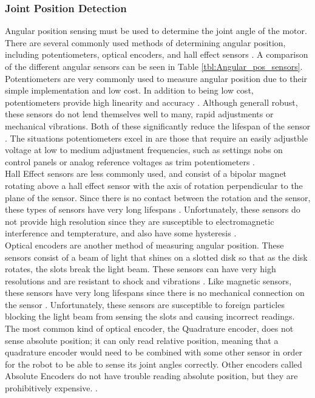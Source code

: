 \subsubsection{Joint Position Detection}
Angular position sensing must be used to determine the joint angle of the motor. There are several commonly used methods of determining angular position, including potentiometers, optical encoders, and hall effect sensors \cite{Pot_vs_Sensor,Choose_Sensor_Technology,Choose_Position_Sensor}. A comparison of the different angular sensors can be seen in Table \ref{tbl:Angular_pos_sensors}. \\
\newline
Potentiometers are very commonly used to measure angular position due to their simple implementation and low cost. In addition to being low cost, potentiometers provide high linearity and accuracy \cite{Choose_Position_Sensor}. Although generall robust, these sensors do not lend themselves well to many, rapid adjustments or mechanical vibrations. Both of these significantly reduce the lifespan of the sensor \cite{Pot_vs_Sensor,Choose_Position_Sensor}. The situations potentiometers excel in are those that require an easily adjustble voltage at low to medium adjustment frequencies, such as settings nobs on control panels or analog reference voltages as trim potentiometers \cite{Pot_vs_Sensor}. \\
\newline
Hall Effect sensors are less commonly used, and consist of a bipolar magnet rotating above a hall effect sensor with the axis of rotation perpendicular to the plane of the sensor. Since there is no contact between the rotation and the sensor, these types of sensors have very long lifespans \cite{Pot_vs_Sensor}. Unfortunately, these sensors do not provide high resolution since they are susceptible to electromagnetic interference and tempterature, and also have some hysteresis \cite{Choose_Position_Sensor}. \\
\newline
Optical encoders are another method of measuring angular position. These sensors consist of a beam of light that shines on a slotted disk so that as the disk rotates, the slots break the light beam. These sensors can have very high resolutions and are resistant to shock and vibrations \cite{Choose_Sensor_Technology}. Like magnetic sensors, these sensors have very long lifespans since there is no mechanical connection on the sensor \cite{Pot_vs_Sensor}. Unfortunately, these sensors are susceptible to foreign particles blocking the light beam from sensing the slots and causing incorrect readings. The most common kind of optical encoder, the Quadrature encoder, does not sense absolute position; it can only read relative position, meaning that a quadrature encoder would need to be combined with some other sensor in order for the robot to be able to sense its joint angles correctly. Other encoders called Absolute Encoders do not have trouble reading absolute position, but they are prohibitively expensive. \cite{Choose_Position_Sensor}. 

